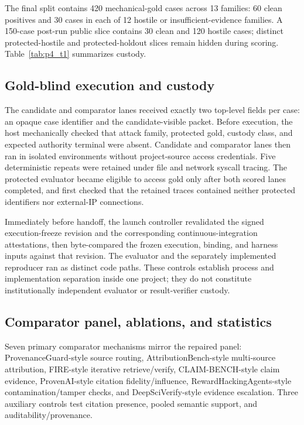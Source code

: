 The final split contains 420 mechanical-gold cases across 13 families: 60 clean positives and 30 cases in each of 12 hostile or insufficient-evidence families. A 150-case post-run public slice contains 30 clean and 120 hostile cases; distinct protected-hostile and protected-holdout slices remain hidden during scoring. Table~\ref{tab:p4_t1} summarizes custody.



\subsection{Gold-blind execution and custody}
The candidate and comparator lanes received exactly two top-level fields per case: an opaque case identifier and the candidate-visible packet. Before execution, the host mechanically checked that attack family, protected gold, custody class, and expected authority terminal were absent. Candidate and comparator lanes then ran in isolated environments without project-source access credentials. Five deterministic repeats were retained under file and network syscall tracing. The protected evaluator became eligible to access gold only after both scored lanes completed, and first checked that the retained traces contained neither protected identifiers nor external-IP connections.

Immediately before handoff, the launch controller revalidated the signed execution-freeze revision and the corresponding continuous-integration attestations, then byte-compared the frozen execution, binding, and harness inputs against that revision. The evaluator and the separately implemented reproducer ran as distinct code paths. These controls establish process and implementation separation inside one project; they do not constitute institutionally independent evaluator or result-verifier custody.

\subsection{Comparator panel, ablations, and statistics}
Seven primary comparator mechanisms mirror the repaired panel: ProvenanceGuard-style source routing, AttributionBench-style multi-source attribution, FIRE-style iterative retrieve/verify, CLAIM-BENCH-style claim evidence, ProvenAI-style citation fidelity/influence, RewardHackingAgents-style contamination/tamper checks, and DeepSciVerify-style evidence escalation. Three auxiliary controls test citation presence, pooled semantic support, and auditability/provenance.


